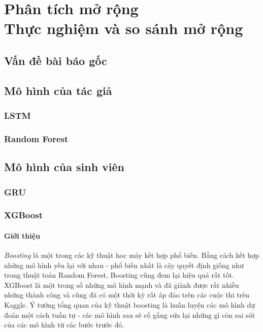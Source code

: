 \chapter{Phân tích mở rộng \\ Thực nghiệm và so sánh mở rộng}
\section{Vấn đề bài báo gốc} 
\section{Mô hình của tác giả} 
\subsection{LSTM}
\subsection{Random Forest}


\section{Mô hình của sinh viên}
\subsection{GRU}
\subsection{XGBoost}
\subsubsection*{Giới thiệu}
\textit{Boosting} là một trong các kỹ thuật hoc máy kết hợp phổ biến. Bằng cách kết hợp những mô hình yếu lại với nhau - phổ biến nhất là cây quyết định giống như trong thuật toán Random Forest, Boosting cũng đem lại hiệu quả rất tốt. XGBoost là một trong số những mô hình mạnh và đã giành được rất nhiều những thành công và cũng đã có một thời kỳ rất áp đảo trên các cuộc thi trên Kaggle. Ý tưởng tổng quan của kỹ thuật boosting là huấn luyện các mô hình dự đoán một cách tuần tự - các mô hình sau sẽ cố gắng sửa lại những gì còn sai sót của các mô hình từ các bước trước đó.
